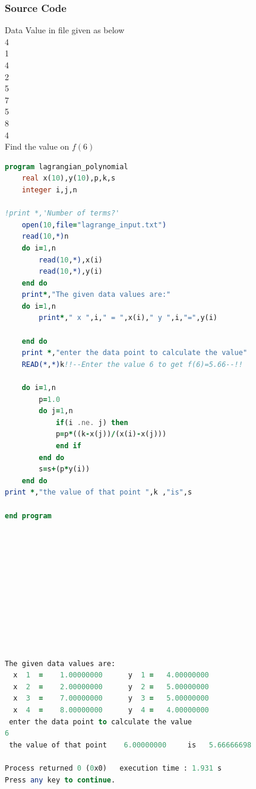 \documentclass{article}
\begin{document}
\subsubsection{Source Code}
Data Value in file given as below\\
4\\
1 \\
4 \\
2 \\
5 \\
7 \\
5\\
8 \\
4\\
Find the value on $f(6)$\\





\begin{lstlisting}[language=Fortran,caption=Lagrange Polynomial]
program lagrangian_polynomial
    real x(10),y(10),p,k,s
    integer i,j,n

!print *,'Number of terms?'
    open(10,file="lagrange_input.txt")
    read(10,*)n
    do i=1,n
        read(10,*),x(i)
        read(10,*),y(i)
    end do
    print*,"The given data values are:"
    do i=1,n
        print*," x ",i," = ",x(i)," y ",i,"=",y(i)

    end do
    print *,"enter the data point to calculate the value"
    READ(*,*)k!!--Enter the value 6 to get f(6)=5.66--!!

    do i=1,n
        p=1.0
        do j=1,n
            if(i .ne. j) then
            p=p*((k-x(j))/(x(i)-x(j)))
            end if
        end do
        s=s+(p*y(i))
    end do
print *,"the value of that point ",k ,"is",s

end program













\end{lstlisting}
\begin{lstlisting}[language=Fortran,caption=Lagrange Polynomial Output]
 The given data values are:
  x  1  =    1.00000000      y  1 =   4.00000000
  x  2  =    2.00000000      y  2 =   5.00000000
  x  3  =    7.00000000      y  3 =   5.00000000
  x  4  =    8.00000000      y  4 =   4.00000000
 enter the data point to calculate the value
6
 the value of that point    6.00000000     is   5.66666698

Process returned 0 (0x0)   execution time : 1.931 s
Press any key to continue.
\end{lstlisting}
\end{document}
